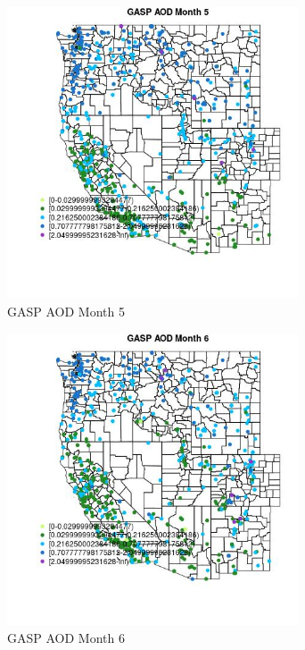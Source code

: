 \begin{figure} 
\centering  
\includegraphics[width=0.77\textwidth]{Code_Outputs/Report_ML_input_PM25_Step4_part_e_de_duplicated_aves_compiled_2019-05-21wNAs_MapObsMo5GASP_AOD.jpg} 
\caption{\label{fig:Report_ML_input_PM25_Step4_part_e_de_duplicated_aves_compiled_2019-05-21wNAsMapObsMo5GASP_AOD}GASP AOD Month 5} 
\end{figure} 
 

\begin{figure} 
\centering  
\includegraphics[width=0.77\textwidth]{Code_Outputs/Report_ML_input_PM25_Step4_part_e_de_duplicated_aves_compiled_2019-05-21wNAs_MapObsMo6GASP_AOD.jpg} 
\caption{\label{fig:Report_ML_input_PM25_Step4_part_e_de_duplicated_aves_compiled_2019-05-21wNAsMapObsMo6GASP_AOD}GASP AOD Month 6} 
\end{figure} 
 

